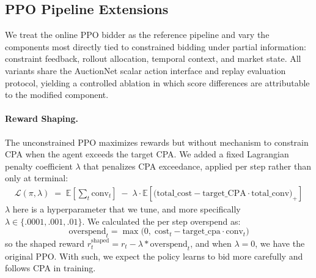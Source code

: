 \documentclass{article}
\begin{document}
\subsection{PPO Pipeline Extensions}
We treat the online PPO bidder as the reference pipeline and vary the components
most directly tied to constrained bidding under partial information: constraint
feedback, rollout allocation, temporal context, and market state. All variants share the AuctionNet scalar action interface and replay evaluation protocol, yielding a controlled ablation in which score differences are attributable to the modified component.

%
%
\paragraph{Reward Shaping.}
The unconstrained PPO maximizes rewards but without mechanism to constrain CPA when the agent exceeds the target CPA. We added a fixed Lagrangian penalty coefficient $\lambda$ that penalizes CPA exceedance, applied per step rather than only at terminal:
\begin{align*}
  \mathcal{L}(\pi, \lambda) \;=\; \mathbb{E}\!\left[\sum_t \text{conv}_t\right] \;-\; \lambda \cdot \mathbb{E}\!\left[\bigl(\text{total\_cost} - \text{target\_CPA} \cdot \text{total\_conv}\bigr)_{+}\right]
\end{align*}
$\lambda$ here is a hyperparameter that we tune, and more specifically $\lambda \in \{.0001, .001, .01\}$. We calculated the per step overspend as:
\[
  \text{overspend}_t = \max\bigl(0,\; \text{cost}_t - \text{target\_cpa} \cdot \text{conv}_t\bigr)
\]
so the shaped reward $r^{\text{shaped}}_t = r_t - \lambda * \text{overspend}_t$, and when $\lambda = 0$, we have the original PPO. With such, we expect the policy learns to bid more carefully and follows CPA in training.

\end{document}
